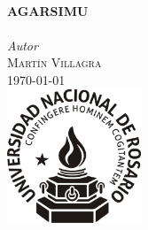 \documentclass[12pt]{article}
\begin{document}
\begin{titlepage}

\HRule \\[0.4cm]
{ \huge \bfseries AGARSIMU}\\[0.4cm] %
\HRule \\[1cm]
 



\Large \emph{Autor}\\
\textsc{Martín Villagra}\\[1cm] %


{\large \today}\\[0.5cm] %


\includegraphics[width=4cm]{logo-unr.png}\\[1cm] %
 

\end{titlepage}
\end{document}
